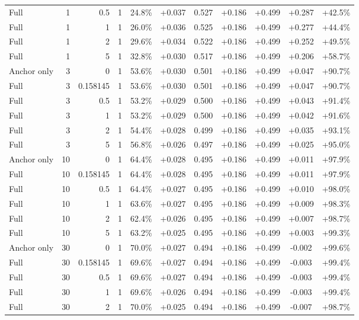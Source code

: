 \begin{table}[htbp]
\begin{tabular}{lrrrccccccc}
Full & 1 & 0.5 & 1 & 24.8\% & +0.037 & 0.527 & +0.186 & +0.499 & +0.287 & +42.5\% \\
Full & 1 & 1 & 1 & 26.0\% & +0.036 & 0.525 & +0.186 & +0.499 & +0.277 & +44.4\% \\
Full & 1 & 2 & 1 & 29.6\% & +0.034 & 0.522 & +0.186 & +0.499 & +0.252 & +49.5\% \\
Full & 1 & 5 & 1 & 32.8\% & +0.030 & 0.517 & +0.186 & +0.499 & +0.206 & +58.7\% \\
Anchor only & 3 & 0 & 1 & 53.6\% & +0.030 & 0.501 & +0.186 & +0.499 & +0.047 & +90.7\% \\
Full & 3 & 0.158145 & 1 & 53.6\% & +0.030 & 0.501 & +0.186 & +0.499 & +0.047 & +90.7\% \\
Full & 3 & 0.5 & 1 & 53.2\% & +0.029 & 0.500 & +0.186 & +0.499 & +0.043 & +91.4\% \\
Full & 3 & 1 & 1 & 53.2\% & +0.029 & 0.500 & +0.186 & +0.499 & +0.042 & +91.6\% \\
Full & 3 & 2 & 1 & 54.4\% & +0.028 & 0.499 & +0.186 & +0.499 & +0.035 & +93.1\% \\
Full & 3 & 5 & 1 & 56.8\% & +0.026 & 0.497 & +0.186 & +0.499 & +0.025 & +95.0\% \\
Anchor only & 10 & 0 & 1 & 64.4\% & +0.028 & 0.495 & +0.186 & +0.499 & +0.011 & +97.9\% \\
Full & 10 & 0.158145 & 1 & 64.4\% & +0.028 & 0.495 & +0.186 & +0.499 & +0.011 & +97.9\% \\
Full & 10 & 0.5 & 1 & 64.4\% & +0.027 & 0.495 & +0.186 & +0.499 & +0.010 & +98.0\% \\
Full & 10 & 1 & 1 & 63.6\% & +0.027 & 0.495 & +0.186 & +0.499 & +0.009 & +98.3\% \\
Full & 10 & 2 & 1 & 62.4\% & +0.026 & 0.495 & +0.186 & +0.499 & +0.007 & +98.7\% \\
Full & 10 & 5 & 1 & 63.2\% & +0.025 & 0.495 & +0.186 & +0.499 & +0.003 & +99.3\% \\
Anchor only & 30 & 0 & 1 & 70.0\% & +0.027 & 0.494 & +0.186 & +0.499 & -0.002 & +99.6\% \\
Full & 30 & 0.158145 & 1 & 69.6\% & +0.027 & 0.494 & +0.186 & +0.499 & -0.003 & +99.4\% \\
Full & 30 & 0.5 & 1 & 69.6\% & +0.027 & 0.494 & +0.186 & +0.499 & -0.003 & +99.4\% \\
Full & 30 & 1 & 1 & 69.6\% & +0.026 & 0.494 & +0.186 & +0.499 & -0.003 & +99.4\% \\
Full & 30 & 2 & 1 & 70.0\% & +0.025 & 0.494 & +0.186 & +0.499 & -0.007 & +98.7\% \\

\end{tabular}
\end{table}
